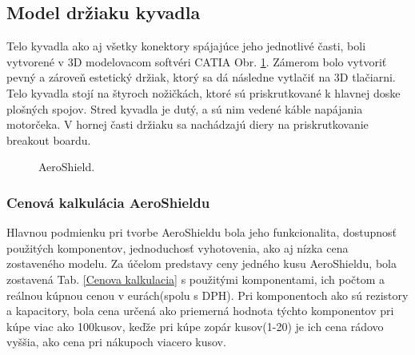 \subsection{Model držiaku kyvadla}
\label{telo}

Telo kyvadla ako aj všetky konektory spájajúce jeho jednotlivé časti, boli vytvorené v 3D modelovacom softvéri CATIA Obr. \ref{OBRAZOK 1.1}. Zámerom bolo vytvoriť pevný a zároveň estetický držiak, ktorý sa dá následne vytlačiť na 3D tlačiarni. Telo kyvadla stojí na štyroch nožičkách, ktoré sú priskrutkované k hlavnej doske plošných spojov. Stred kyvadla je dutý, a sú nim vedené káble napájania motorčeka. V hornej časti držiaku sa nachádzajú diery na priskrutkovanie breakout boardu. 

\begin{figure}
	\hfill
	\hfill
	\hfill
	\caption{AeroShield.}\label{OBRAZOK 1.1}
\end{figure}


\subsubsection{Cenová kalkulácia AeroShieldu}

Hlavnou podmienku pri tvorbe AeroShieldu bola jeho funkcionalita, dostupnosť použitých komponentov, jednoduchosť vyhotovenia, ako aj nízka cena zostaveného modelu. Za účelom predstavy ceny jedného kusu AeroShieldu, bola zostavená Tab. \ref{Cenova kalkulacia} s použitými komponentami, ich počtom a reálnou kúpnou cenou v eurách(spolu s DPH). Pri komponentoch ako sú rezistory a kapacitory, bola cena určená ako priemerná hodnota týchto komponentov pri kúpe viac ako 100kusov, keďže pri kúpe zopár kusov(1-20) je ich cena rádovo vyššia, ako cena pri nákupoch viacero kusov. 

